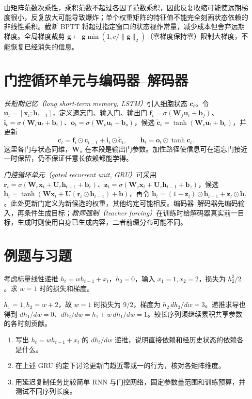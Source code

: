 由矩阵范数次乘性，乘积范数不超过各因子范数乘积，因此反复收缩可能使远期梯度很小，反复放大可能导致爆炸；单个权重矩阵的特征值不能完全刻画状态依赖的非线性乘积。截断 BPTT 将超过指定窗口的状态视作常量，减少成本但舍弃远期梯度。全局梯度裁剪 $\mathbf g\leftarrow\mathbf g\min(1,c/\|\mathbf g\|_2)$（零梯度保持零）限制大梯度，不能恢复已经消失的信息。

\section{门控循环单元与编码器--解码器}
\emph{长短期记忆（long short-term memory, LSTM）}引入细胞状态 $\mathbf c_t$。令 $\mathbf u_t=[\mathbf x_t;\mathbf h_{t-1}]$，定义遗忘门、输入门、输出门 $\mathbf f_t=\sigma(\mathbf W_f\mathbf u_t+\mathbf b_f)$、$\mathbf i_t=\sigma(\mathbf W_i\mathbf u_t+\mathbf b_i)$、$\mathbf o_t=\sigma(\mathbf W_o\mathbf u_t+\mathbf b_o)$，候选 $\widetilde{\mathbf c}_t=\tanh(\mathbf W_c\mathbf u_t+\mathbf b_c)$，并更新
\[
\mathbf c_t=\mathbf f_t\odot\mathbf c_{t-1}+\mathbf i_t\odot\widetilde{\mathbf c}_t,
\qquad \mathbf h_t=\mathbf o_t\odot\tanh\mathbf c_t.
\]
这里各门与状态同维，$\mathbf W_o$ 在本段是输出门参数。加性路径使信息可在遗忘门接近一时保留，仍不保证任意长依赖都能学得。

\emph{门控循环单元（gated recurrent unit, GRU）}可采用 $\mathbf r_t=\sigma(\mathbf W_r\mathbf x_t+\mathbf U_r\mathbf h_{t-1}+\mathbf b_r)$、$\mathbf z_t=\sigma(\mathbf W_z\mathbf x_t+\mathbf U_z\mathbf h_{t-1}+\mathbf b_z)$，候选 $\widetilde{\mathbf h}_t=\tanh(\mathbf W\mathbf x_t+\mathbf U(\mathbf r_t\odot\mathbf h_{t-1})+\mathbf b)$，再令 $\mathbf h_t=(1-\mathbf z_t)\odot\mathbf h_{t-1}+\mathbf z_t\odot\widetilde{\mathbf h}_t$。此处更新门定义为新候选的权重，其他约定可能相反。编码器--解码器先编码输入，再条件生成目标；\emph{教师强制（teacher forcing）}在训练时给解码器真实前一目标，生成时则使用自身已生成内容，二者前缀分布可能不同。

\section{例题与习题}
\begin{example}[共享权重的时间梯度]
考虑标量线性递推 $h_t=wh_{t-1}+x_t$，$h_0=0$，输入 $x_1=1,x_2=2$，损失为 $h_2^2/2$。求 $w=1$ 时的损失和梯度。
\end{example}
\begin{solve}
$h_1=1,h_2=w+2$，故 $w=1$ 时损失为 $9/2$，梯度为 $h_2\,dh_2/dw=3$。递推求导也得到 $dh_1/dw=0$、$dh_2/dw=h_1+w\,dh_1/dw=1$。较长序列须继续累积共享参数的各时刻贡献。
\end{solve}
\begin{enumerate}
\item 写出 $h_t=wh_{t-1}+x_t$ 的 $dh_t/dw$ 递推，说明直接依赖和经历史状态的依赖各是什么。
\item 在上述 GRU 约定下讨论更新门趋近零或一的行为，核对各矩阵维度。
\item 用延迟复制任务比较简单 RNN 与门控网络，固定参数量范围和训练预算，并测试不同序列长度。
\end{enumerate}

